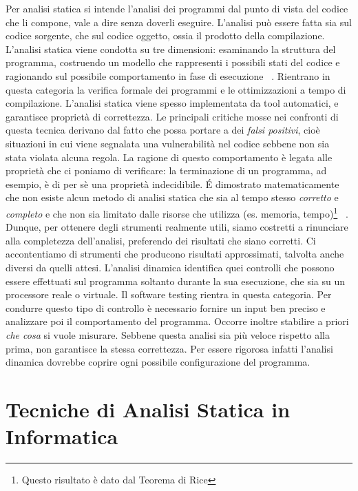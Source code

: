 Per analisi statica si intende l'analisi dei programmi dal punto di vista del codice che li compone, vale a dire senza doverli eseguire. L'analisi può essere fatta sia sul codice sorgente, che sul codice oggetto, ossia  il prodotto della compilazione.\newline
\indent L'analisi statica viene condotta su tre dimensioni: esaminando la struttura del programma, costruendo un modello che rappresenti i possibili stati del codice e ragionando sul possibile comportamento in fase di esecuzione ~\cite{ernst-ijcai97}. 
Rientrano in questa categoria la verifica formale dei programmi e le ottimizzazioni a tempo di compilazione. L'analisi statica viene spesso implementata da tool automatici, e garantisce proprietà di correttezza. Le principali critiche mosse nei confronti di questa tecnica derivano dal fatto che possa portare a dei \textit{falsi positivi}, cioè situazioni in cui viene segnalata una vulnerabilità nel codice sebbene non sia stata violata alcuna regola.
La ragione di questo comportamento è legata alle proprietà che ci poniamo di verificare: la terminazione di un programma, ad esempio, è di per sè una proprietà indecidibile. \'E dimostrato matematicamente che non esiste alcun metodo di analisi statica che sia al tempo stesso \emph{corretto} e \emph{completo} e che non sia limitato dalle risorse che utilizza (es. memoria, tempo)\footnote{Questo risultato è dato dal Teorema di Rice} ~\cite{ausiello2003linguaggi}. Dunque, per ottenere degli strumenti realmente utili, siamo costretti a rinunciare alla completezza dell'analisi, preferendo dei risultati che siano corretti. Ci accontentiamo di strumenti che producono risultati approssimati, talvolta anche diversi da quelli attesi.\newline
\indent L'analisi dinamica identifica quei controlli che possono essere effettuati sul programma soltanto durante la sua esecuzione, che sia su un processore reale o virtuale. Il software testing rientra in questa categoria. Per condurre questo tipo di controllo è necessario fornire un input ben preciso e analizzare poi il comportamento del programma. Occorre inoltre stabilire a priori \emph{che cosa} si vuole misurare. Sebbene questa analisi sia più veloce rispetto alla prima, non garantisce la stessa correttezza. Per essere rigorosa infatti l'analisi dinamica dovrebbe coprire ogni possibile configurazione del programma.\\


\section{Tecniche di Analisi Statica in Informatica}

